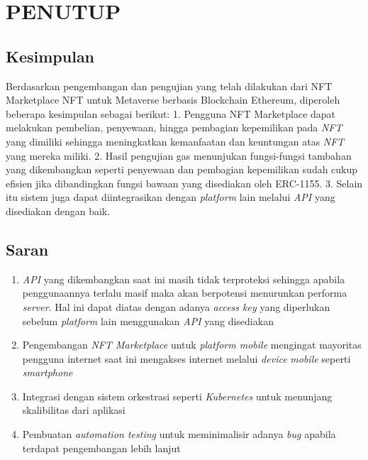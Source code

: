 \chapter{PENUTUP}
\label{chap:penutup}

\section{Kesimpulan}
\label{sec:kesimpulan}

Berdasarkan pengembangan dan pengujian yang telah dilakukan dari NFT Marketplace NFT untuk Metaverse berbasis Blockchain Ethereum, diperoleh beberapa kesimpulan sebagai berikut:
1. Pengguna NFT Marketplace dapat melakukan pembelian, penyewaan, hingga pembagian kepemilikan pada \emph{NFT} yang dimiliki sehingga meningkatkan kemanfaatan dan keuntungan atas \emph{NFT} yang mereka miliki. 
2.  Hasil pengujian gas menunjukan fungsi-fungsi tambahan yang dikembangkan seperti penyewaan dan pembagian kepemilikan sudah cukup efisien jika dibandingkan fungsi bawaan yang disediakan oleh ERC-1155.
3. Selain itu sistem juga dapat diintegrasikan dengan \emph{platform} lain melalui \emph{API} yang disediakan dengan baik.

\section{Saran}
\label{chap:saran}

\begin{enumerate}[nolistsep]
\item \emph{API} yang dikembangkan saat ini masih tidak terproteksi sehingga apabila penggunaannya terlalu masif maka akan berpotensi menurunkan performa \emph{server}. Hal ini dapat diatas dengan adanya \emph{access key} yang diperlukan sebelum \emph{platform} lain menggunakan \emph{API} yang disediakan
\item Pengembangan \emph{NFT Marketplace} untuk \emph{platform mobile} mengingat mayoritas pengguna internet saat ini mengakses internet melalui \emph{device} \emph{mobile} seperti \emph{smartphone}
\item Integrasi dengan sistem orkestrasi seperti \emph{Kubernetes} untuk menunjang skalibilitas dari aplikasi
\item Pembuatan \emph{automation testing} untuk meminimalisir adanya \emph{bug} apabila terdapat pengembangan lebih lanjut
\end{enumerate}